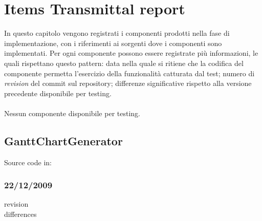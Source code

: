 \chapter{Items Transmittal report}
In questo capitolo vengono registrati i componenti prodotti nella fase di
implementazione, con i riferimenti ai sorgenti dove i componenti sono
implementati. Per ogni componente possono essere registrate pi\`u informazioni,
le quali rispettano questo pattern: data nella quale si ritiene che la codifica del componente permetta l'esercizio della funzionalit\`a
catturata dal test; numero di \emph{revision} del commit sul repository;
differenze significative rispetto alla versione precedente disponibile per
testing.
\\ \\
Nessun componente disponibile per testing.

\section{GanttChartGenerator}
Source code in:
\subsection{22/12/2009}
\begin{description}
\item[revision]
\item[differences]
\end{description}
